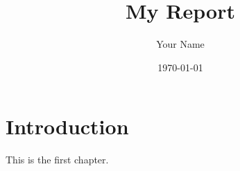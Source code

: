 \documentclass{report}
\title{My Report}
\author{Your Name}
\date{\today}
\begin{document}
\maketitle

\chapter{Introduction}

This is the first chapter.
\end{document}
